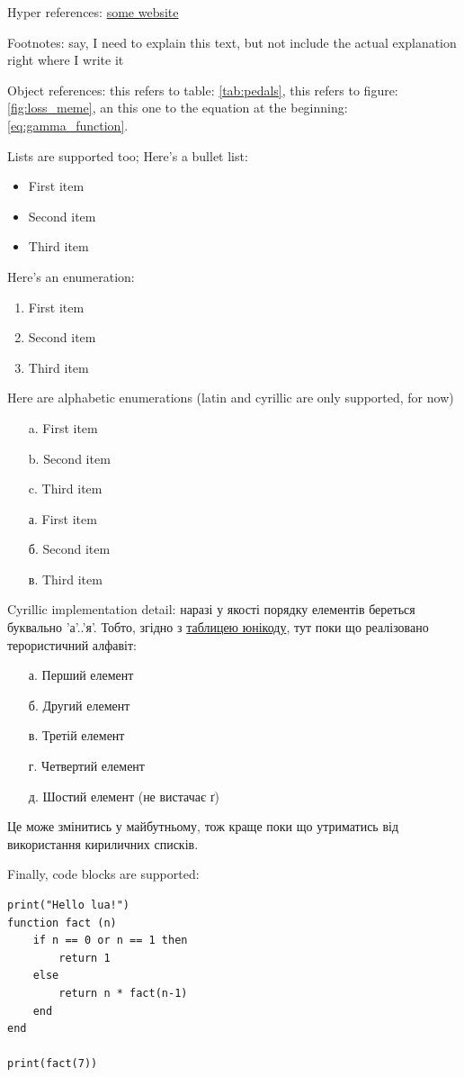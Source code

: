 \documentclass[a4paper]{article}
\newcommand{\tb}{
    \hspace*{10mm}
} %
\newcommand{\tbln}{
    \newline 
    \tb
} %
\begin{document}
\tb Hyper references: \href{https://www.somewebsite.com/}{some website}
\tbln Footnotes: say, I need to explain this text, but not include the actual explanation right where I write it\footnotemark[1]
\tbln Object references: this refers to table: \ref{tab:pedals}, this refers to figure: \ref{fig:loss_meme}, an this one to the equation at the beginning: \ref{eq:gamma_function}.
\tbln Lists are supported too; Here's a bullet list:
\begin{itemize}
\item First item
\item Second item
\item Third item
\end{itemize}
\tb Here's an enumeration:
\begin{enumerate}
\item First item
\item Second item
\item Third item
\end{enumerate}
\tb Here are alphabetic enumerations (latin and cyrillic are only supported, for now)
\begin{enumerate}
\item[a.] First item
\item[b.] Second item
\item[c.] Third item
\end{enumerate}
\begin{enumerate}
\item[а.] First item
\item[б.] Second item
\item[в.] Third item
\end{enumerate}
\tb Cyrillic implementation detail: наразі у якості порядку елементів береться буквально 'а'..'я'. Тобто, згідно з \href{https://en.wikipedia.org/wiki/Cyrillic_(Unicode_block)}{таблицею юнікоду}, тут поки що реалізовано терористичний алфавіт:
\begin{enumerate}
\item[а.] Перший елемент
\item[б.] Другий елемент
\item[в.] Третій елемент
\item[г.] Четвертий елемент
\item[д.] Шостий елемент (не вистачає ґ)
\end{enumerate}
\tb Це може змінитись у майбутньому, тож краще поки що утриматись від використання кириличних списків.
\tbln Finally, code blocks are supported:
\begin{verbatim}
print("Hello lua!")
function fact (n)
    if n == 0 or n == 1 then
        return 1
    else
        return n * fact(n-1)
    end
end

print(fact(7))
\end{verbatim}
\end{document}
